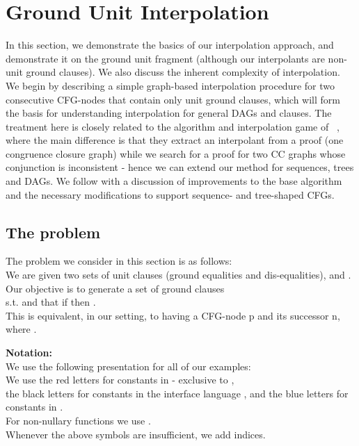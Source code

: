 \section{Ground Unit Interpolation}\label{section:scoping:ugfole}
In this section, we demonstrate the basics of our interpolation approach, and demonstrate it on the ground unit fragment (although our interpolants are non-unit ground clauses). We also discuss the inherent complexity of interpolation.
We begin by describing a simple graph-based interpolation procedure for two consecutive CFG-nodes that contain only unit ground clauses, which will form the basis for understanding interpolation for general DAGs and clauses. The treatment here is closely related to the algorithm and interpolation game of ~\cite{FuchsGoelGrundyKrsticTinelli2012}, where the main difference is that they extract an interpolant from a proof (one congruence closure graph) while we search for a proof for two CC graphs whose conjunction is inconsistent - hence we can extend our method for sequences, trees and DAGs.
We follow with a discussion of improvements to the base algorithm and the necessary modifications to support sequence- and tree-shaped CFGs.

\subsection{The problem}
The problem we consider in this section is as follows:\\
We are given two sets of unit clauses (ground equalities and dis-equalities),  and .\\
Our objective is to generate a set of ground clauses \\
 s.t.  and that if  then .\\
This is equivalent, in our setting, to having a CFG-node p and its successor n, where .

\textbf{Notation:}\\
We use the following presentation for all of our examples:\\
We use the red letters \m{\textcolor{red}{u,v,w,x,y,z}} for constants in \langtp - exclusive to ,\\
the black letters  for constants in the interface language \langI, 
and the blue letters \m{\textcolor{blue}{l,m,n,o,p}} for constants in \langbp.\\
For non-nullary functions we use . \\
Whenever the above symbols are insufficient, we add indices.

